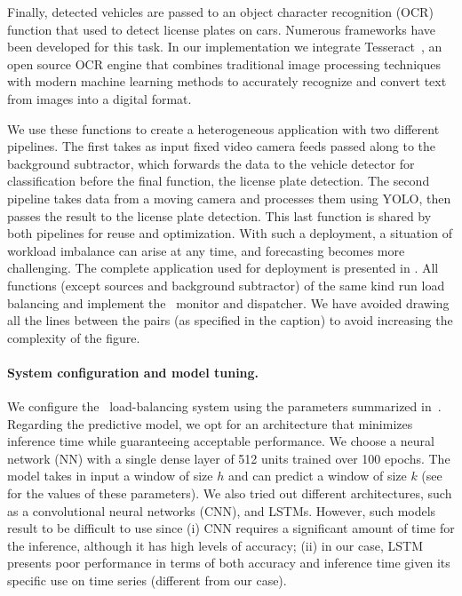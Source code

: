 Finally, detected vehicles are passed to an object character recognition (OCR) function that used to detect license plates on cars. Numerous frameworks have been developed for this task. In our implementation we integrate Tesseract~\cite{ocr}, an open source OCR engine that combines traditional image processing techniques with modern machine learning methods to accurately recognize and convert text from images into a digital format.

We use these functions to create a heterogeneous application with two different pipelines. The first takes as input fixed video camera feeds passed along to the background subtractor, which forwards the data to the vehicle detector for classification before the final function, the license plate detection. The second pipeline takes data from a moving camera and processes them using YOLO, then passes the result to the license plate detection. This last function is shared by both pipelines for reuse and optimization. With such a deployment, a situation of workload imbalance can arise at any time, and forecasting becomes more challenging. The complete application used for deployment is presented in . All functions (except sources and background subtractor) of the same kind run load balancing and implement the~\videojam{} monitor and dispatcher. We have avoided drawing all the lines between the pairs (as specified in the caption) to avoid increasing the complexity of the figure.

\paragraph{System configuration and model tuning.} We configure the~\videojam{} load-balancing system using the parameters summarized in~. Regarding the predictive model, we opt for an architecture that minimizes inference time while guaranteeing acceptable performance. We choose a neural network (NN) with a single dense layer of 512 units trained over 100 epochs. The model takes in input a window of size $h$ and can predict a window of size $k$ (see~ for the values of these parameters). We also tried out different architectures, such as a convolutional neural networks (CNN), and LSTMs. However, such models result to be difficult to use since (i) CNN requires a significant amount of time for the inference, although it has high levels of accuracy; (ii) in our case, LSTM presents poor performance in terms of both accuracy and inference time given its specific use on time series (different from our case).


